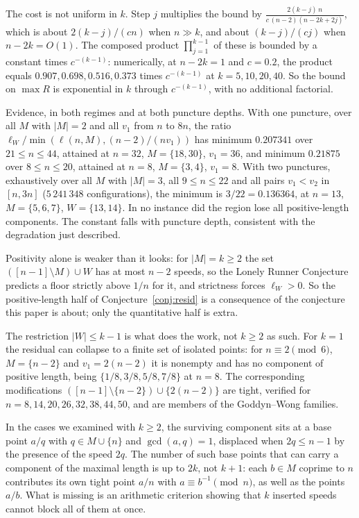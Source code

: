 \documentclass[11pt]{amsart}
\theoremstyle{plain}
\theoremstyle{definition}
\begin{document}
The cost is not uniform in $k$. Step $j$ multiplies the bound by
$\frac{2(k-j)\,n}{c\,(n-2)(n-2k+2j)}$, which is about $2(k-j)/(cn)$ when $n\gg k$, and about
$(k-j)/(cj)$ when $n-2k=O(1)$. The composed product $\prod_{j=1}^{k-1}$ of these is bounded by a
constant times $c^{-(k-1)}$: numerically, at $n-2k=1$ and $c=0.2$, the product equals
$0.907,0.698,0.516,0.373$ times $c^{-(k-1)}$ at $k=5,10,20,40$. So the bound on $\max R$ is
exponential in $k$ through $c^{-(k-1)}$, with no additional factorial.

Evidence, in both regimes and at both puncture depths. With one puncture, over all $M$ with $|M|=2$
and all $v_1$ from $n$ to $8n$, the ratio $\ell_W\big/\min(\ell(n,M),(n-2)/(nv_1))$ has minimum
$0.207341$ over $21\le n\le44$, attained at $n=32$, $M=\{18,30\}$, $v_1=36$, and minimum $0.21875$
over $8\le n\le20$, attained at $n=8$, $M=\{3,4\}$, $v_1=8$. With two punctures, exhaustively over all $M$ with $|M|=3$, all
$9\le n\le22$ and all pairs $v_1<v_2$ in $[n,3n]$ ($5\,241\,348$ configurations), the minimum is
$3/22=0.136364$, at $n=13$, $M=\{5,6,7\}$, $W=\{13,14\}$. In no instance did the region lose all positive-length components. The constant falls
with puncture depth, consistent with the degradation just described.

Positivity alone is weaker than it looks: for $|M|=k\ge2$ the set $([n-1]\setminus M)\cup W$ has at
most $n-2$ speeds, so the Lonely Runner Conjecture predicts a floor strictly above $1/n$ for it, and
strictness forces $\ell_W>0$. So the positive-length half of Conjecture~\ref{conj:resid} is a
consequence of the conjecture this paper is about; only the quantitative half is extra.

The restriction $|W|\le k-1$ is what does the work, not $k\ge2$ as such. For $k=1$ the residual can
collapse to a finite set of isolated points: for $n\equiv2\pmod 6$, $M=\{n-2\}$ and $v_1=2(n-2)$ it
is nonempty and has no component of positive length, being $\{1/8,3/8,5/8,7/8\}$ at $n=8$. The
corresponding modifications $([n-1]\setminus\{n-2\})\cup\{2(n-2)\}$ are tight, verified for
$n=8,14,20,26,32,38,44,50$, and are members of the Goddyn--Wong families.

In the cases we examined with $k\ge2$, the surviving component sits at a base point $a/q$ with
$q\in M\cup\{n\}$ and $\gcd(a,q)=1$, displaced when $2q\le n-1$ by the presence of the speed $2q$.
The number of such base points that can carry a component of the maximal length is up to $2k$, not
$k+1$: each $b\in M$ coprime to $n$ contributes its own tight point $a/n$ with $a\equiv b^{-1}\pmod n$, as
well as the points $a/b$. What is missing is an arithmetic criterion showing
that $k$ inserted speeds cannot block all of them at once.
\end{document}

